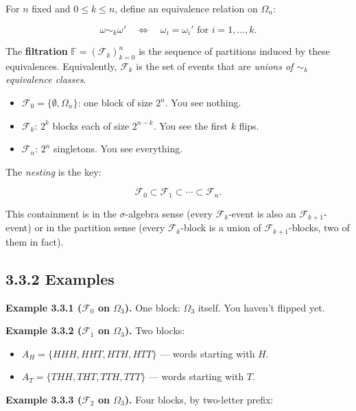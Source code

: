 \documentclass[
  10pt,
  twoside]{book}
\providecommand{\tightlist}{%
  \setlength{\itemsep}{0pt}\setlength{\parskip}{0pt}}
\begin{document}
For \(n\) fixed and \(0 \le k \le n\), define an equivalence relation on
\(\Omega_n\):

\[\omega \sim_k \omega' \quad\Longleftrightarrow\quad \omega_i = \omega_i' \text{ for } i = 1, \ldots, k.\]

The \textbf{filtration} \(\mathbb F = (\mathcal F_k)_{k=0}^n\) is the
sequence of partitions induced by these equivalences. Equivalently,
\(\mathcal F_k\) is the set of events that are \emph{unions of
\(\sim_k\) equivalence classes}.

\begin{itemize}
\tightlist
\item
  \(\mathcal F_0 = \{\emptyset, \Omega_n\}\): one block of size \(2^n\).
  You see nothing.
\item
  \(\mathcal F_k\): \(2^k\) blocks each of size \(2^{n-k}\). You see the
  first \(k\) flips.
\item
  \(\mathcal F_n\): \(2^n\) singletons. You see everything.
\end{itemize}

The \emph{nesting} is the key:

\[\mathcal F_0 \subset \mathcal F_1 \subset \cdots \subset \mathcal F_n.\]

This containment is in the \(\sigma\)-algebra sense (every
\(\mathcal F_k\)-event is also an \(\mathcal F_{k+1}\)-event) or in the
partition sense (every \(\mathcal F_k\)-block is a union of
\(\mathcal F_{k+1}\)-blocks, two of them in fact).

\subsection{3.3.2 Examples}\label{examples-13}

\textbf{Example 3.3.1 (\(\mathcal F_0\) on \(\Omega_3\)).} One block:
\(\Omega_3\) itself. You haven't flipped yet.

\textbf{Example 3.3.2 (\(\mathcal F_1\) on \(\Omega_3\)).} Two blocks:

\begin{itemize}
\tightlist
\item
  \(A_H = \{HHH, HHT, HTH, HTT\}\) --- words starting with \(H\).
\item
  \(A_T = \{THH, THT, TTH, TTT\}\) --- words starting with \(T\).
\end{itemize}

\textbf{Example 3.3.3 (\(\mathcal F_2\) on \(\Omega_3\)).} Four blocks,
by two-letter prefix:
\end{document}
